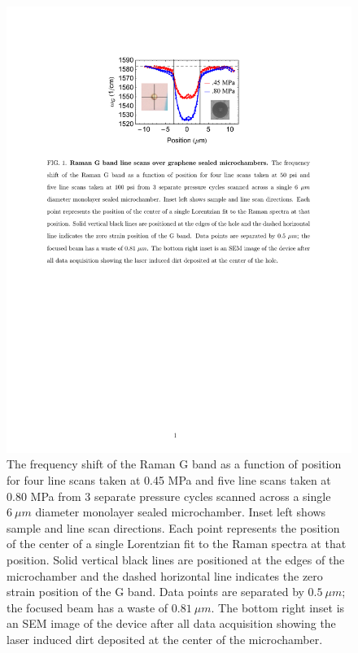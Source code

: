 \begin{figure}
\begin{center}
\includegraphics{Figs_Friction/Figure_2.pdf}
\end{center}
\caption{\label{qualresults}The frequency shift of the Raman G band as a function of position for four line scans taken at 0.45 MPa and five line scans taken at 0.80 MPa from 3 separate pressure cycles scanned across a single $6 \ \mu m$ diameter monolayer sealed microchamber. Inset left shows sample and line scan directions.  Each point represents the position of the center of a single Lorentzian fit to the Raman spectra at that position.  Solid vertical black lines are positioned at the edges of the microchamber and the dashed horizontal line indicates the zero strain position of the G band.  Data points are separated by $0.5 \ \mu m$; the focused beam has a waste of $0.81 \ \mu m$.  The bottom right inset is an SEM image of the device after all data acquisition showing the laser induced dirt deposited at the center of the microchamber.}
\end{figure}

